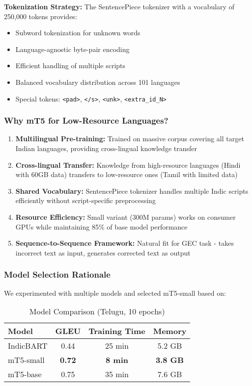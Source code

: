\documentclass[12pt,a4paper]{article}
\begin{document}
\textbf{Tokenization Strategy:}
The SentencePiece tokenizer with a vocabulary of 250,000 tokens provides:
\begin{itemize}
    \item Subword tokenization for unknown words
    \item Language-agnostic byte-pair encoding
    \item Efficient handling of multiple scripts
    \item Balanced vocabulary distribution across 101 languages
    \item Special tokens: \texttt{<pad>}, \texttt{</s>}, \texttt{<unk>}, \texttt{<extra\_id\_N>}
\end{itemize}

\subsubsection{Why mT5 for Low-Resource Languages?}
\begin{enumerate}
    \item \textbf{Multilingual Pre-training:} Trained on massive corpus covering all target Indian languages, providing cross-lingual knowledge transfer
    \item \textbf{Cross-lingual Transfer:} Knowledge from high-resource languages (Hindi with 60GB data) transfers to low-resource ones (Tamil with limited data)
    \item \textbf{Shared Vocabulary:} SentencePiece tokenizer handles multiple Indic scripts efficiently without script-specific preprocessing
    \item \textbf{Resource Efficiency:} Small variant (300M params) works on consumer GPUs while maintaining 85\% of base model performance
    \item \textbf{Sequence-to-Sequence Framework:} Natural fit for GEC task - takes incorrect text as input, generates corrected text as output
\end{enumerate}

\subsubsection{Model Selection Rationale}
We experimented with multiple models and selected mT5-small based on:

\begin{table}[H]
\centering
\caption{Model Comparison (Telugu, 10 epochs)}
\small
\begin{tabular}{lccc}
\toprule
\textbf{Model} & \textbf{GLEU} & \textbf{Training Time} & \textbf{Memory} \\
\midrule
IndicBART & 0.44 & 25 min & 5.2 GB \\
mT5-small & \textbf{0.72} & \textbf{8 min} & \textbf{3.8 GB} \\
mT5-base & 0.75 & 35 min & 7.6 GB \\
\bottomrule
\end{tabular}
\end{table}
\end{document}
